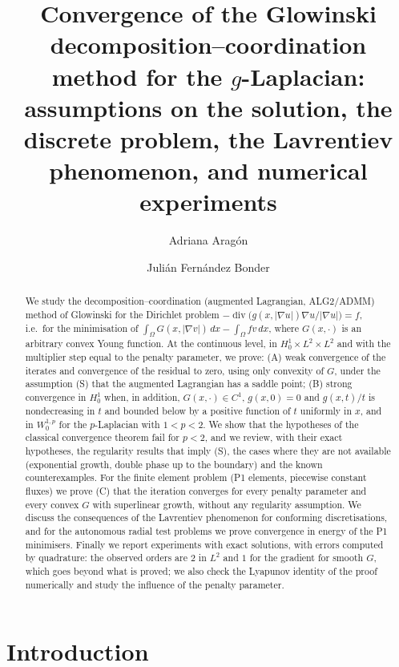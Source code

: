 \documentclass[11pt]{amsart}
\title[Glowinski's method for the $g$-Laplacian]{Convergence of the Glowinski decomposition--coordination method for the $g$-Laplacian: assumptions on the solution, the discrete problem, the Lavrentiev phenomenon, and numerical experiments}
\author{Adriana Arag\'on}
\author{Juli\'an Fern\'andez Bonder}
\theoremstyle{definition}
\theoremstyle{remark}
\numberwithin{equation}{section}
\newcommand{\dx}{\,dx}
\newcommand{\abs}[1]{\lvert #1\rvert}
\DeclareMathOperator{\divg}{div}
\begin{document}
\begin{abstract}
We study the decomposition--coordination (augmented Lagrangian, ALG2/ADMM) method of Glowinski for the Dirichlet problem $-\divg\big(g(x,\abs{\nabla u})\nabla u/\abs{\nabla u}\big)=f$, i.e.\ for the minimisation of $\int_\Omega G(x,\abs{\nabla v})\dx-\int_\Omega fv\dx$, where $G(x,\cdot)$ is an arbitrary convex Young function. At the continuous level, in $H^1_0\times L^2\times L^2$ and with the multiplier step equal to the penalty parameter, we prove: (A) weak convergence of the iterates and convergence of the residual to zero, using only convexity of $G$, under the assumption (S) that the augmented Lagrangian has a saddle point; (B) strong convergence in $H^1_0$ when, in addition, $G(x,\cdot)\in C^1$, $g(x,0)=0$ and $g(x,t)/t$ is nondecreasing in $t$ and bounded below by a positive function of $t$ uniformly in $x$, and in $W^{1,p}_0$ for the $p$-Laplacian with $1<p<2$. We show that the hypotheses of the classical convergence theorem fail for $p<2$, and we review, with their exact hypotheses, the regularity results that imply (S), the cases where they are not available (exponential growth, double phase up to the boundary) and the known counterexamples. For the finite element problem (P1 elements, piecewise constant fluxes) we prove (C) that the iteration converges for every penalty parameter and every convex $G$ with superlinear growth, without any regularity assumption. We discuss the consequences of the Lavrentiev phenomenon for conforming discretisations, and for the autonomous radial test problems we prove convergence in energy of the P1 minimisers. Finally we report experiments with exact solutions, with errors computed by quadrature: the observed orders are $2$ in $L^2$ and $1$ for the gradient for smooth $G$, which goes beyond what is proved; we also check the Lyapunov identity of the proof numerically and study the influence of the penalty parameter.
\end{abstract}

\maketitle

\tableofcontents

\section{Introduction}\label{sec:intro}
\end{document}

